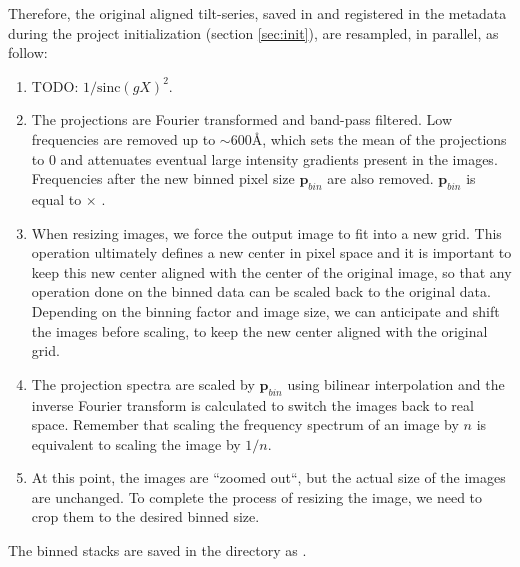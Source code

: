 Therefore, the original aligned tilt-series, saved in  and registered in the metadata during the project initialization (section \ref{sec:init}), are resampled, in parallel, as follow:
\begin{enumerate}
    \item TODO: $1/{\mathrm{sinc}(gX)}^2$.

    \item The projections are Fourier transformed and band-pass filtered. Low frequencies are removed up to $\sim$600\r{A}, which sets the mean of the projections to 0 and attenuates eventual large intensity gradients present in the images. Frequencies after the new binned pixel size $\bm{p}_{bin}$ are also removed.  $\bm{p}_{bin}$ is equal to  $\times$ .

    \item When resizing images, we force the output image to fit into a new grid. This operation ultimately defines a new center in pixel space and it is important to keep this new center aligned with the center of the original image, so that any operation done on the binned data can be scaled back to the original data. Depending on the binning factor and image size, we can anticipate and shift the images before scaling, to keep the new center aligned with the original grid.

    \item The projection spectra are scaled by $\bm{p}_{bin}$ using bilinear interpolation and the inverse Fourier transform is calculated to switch the images back to real space. Remember that scaling the frequency spectrum of an image by $n$ is equivalent to scaling the image by $1/n$.

    \item At this point, the images are ``zoomed out``, but the actual size of the images are unchanged. To complete the process of resizing the image, we need to crop them to the desired binned size.
\end{enumerate}

The binned stacks are saved in the  directory as .


